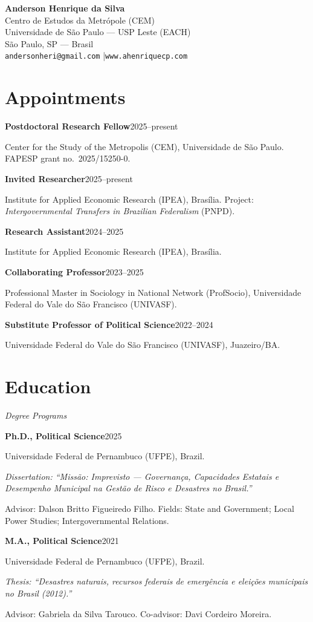 \documentclass[11pt]{article}
\newcommand{\cvsubsection}[1]{\vspace{0.3em}\textit{#1}\par\vspace{0.1em}}
\newcommand{\entry}[2]{\noindent\textbf{#1}\hfill #2\par}
\newcommand{\detail}[1]{\noindent\hspace*{1.5em}#1\par}
\newcommand{\detailem}[1]{\noindent\hspace*{1.5em}\textit{#1}\par}
\begin{document}
\begin{center}
{\LARGE \textbf{Anderson Henrique da Silva}}\\[0.5em]
Centro de Estudos da Metrópole (CEM)\\
Universidade de São Paulo — USP Leste (EACH)\\
São Paulo, SP — Brasil\\
\texttt{andersonheri@gmail.com} \quad|\quad \texttt{www.ahenriquecp.com}
\end{center}

\vspace{0.8em}

\section{Appointments}

\entry{Postdoctoral Research Fellow}{2025--present}
\detail{Center for the Study of the Metropolis (CEM), Universidade de São Paulo. FAPESP grant no.\ 2025/15250-0.}

\entry{Invited Researcher}{2025--present}
\detail{Institute for Applied Economic Research (IPEA), Brasília. Project: \textit{Intergovernmental Transfers in Brazilian Federalism} (PNPD).}

\entry{Research Assistant}{2024--2025}
\detail{Institute for Applied Economic Research (IPEA), Brasília.}

\entry{Collaborating Professor}{2023--2025}
\detail{Professional Master in Sociology in National Network (ProfSocio), Universidade Federal do Vale do São Francisco (UNIVASF).}

\entry{Substitute Professor of Political Science}{2022--2024}
\detail{Universidade Federal do Vale do São Francisco (UNIVASF), Juazeiro/BA.}

\section{Education}
\cvsubsection{Degree Programs}

\entry{Ph.D., Political Science}{2025}
\detail{Universidade Federal de Pernambuco (UFPE), Brazil.}
\detailem{Dissertation: ``Missão: Imprevisto — Governança, Capacidades Estatais e Desempenho Municipal na Gestão de Risco e Desastres no Brasil.''}
\detail{Advisor: Dalson Britto Figueiredo Filho. Fields: State and Government; Local Power Studies; Intergovernmental Relations.}

\entry{M.A., Political Science}{2021}
\detail{Universidade Federal de Pernambuco (UFPE), Brazil.}
\detailem{Thesis: ``Desastres naturais, recursos federais de emergência e eleições municipais no Brasil (2012).''}
\detail{Advisor: Gabriela da Silva Tarouco. Co-advisor: Davi Cordeiro Moreira.}
\end{document}
